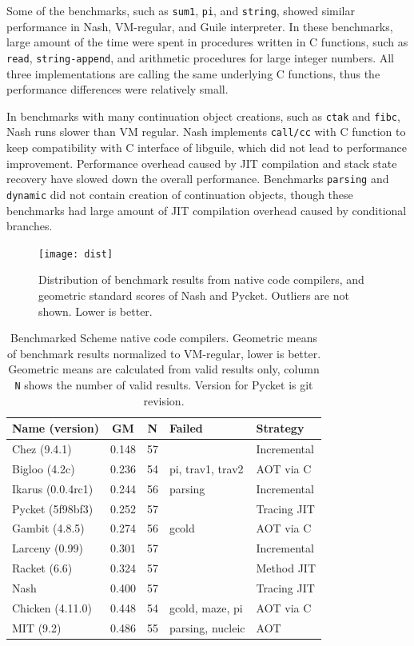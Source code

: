 \documentclass[preprint, 10pt]{sigplanconf}
\begin{document}
Some of the benchmarks, such as \texttt{sum1}, \texttt{pi}, and
\texttt{string}, showed similar performance in Nash, VM-regular, and Guile
interpreter. In these benchmarks, large amount of the time were spent in
procedures written in C functions, such as \texttt{read},
\texttt{string-append}, and arithmetic procedures for large integer numbers.
All three implementations are calling the same underlying C functions, thus
the performance differences were relatively small.

In benchmarks with many continuation object creations, such as \texttt{ctak}
and \texttt{fibc}, Nash runs slower than VM regular. Nash implements
\texttt{call/cc} with C function to keep compatibility with C interface of
libguile, which did not lead to performance improvement.  Performance overhead
caused by JIT compilation and stack state recovery have slowed down the
overall performance.  Benchmarks \texttt{parsing} and \texttt{dynamic} did not
contain creation of continuation objects, though these benchmarks had large
amount of JIT compilation overhead caused by conditional branches.

\begin{figure}
  \centering
  \texttt{[image: dist]}
  \caption{Distribution of benchmark results from native code compilers, and
    geometric standard scores of Nash and Pycket.  Outliers are not
    shown. Lower is better.}
  \label{fig:dist}
\end{figure}

\begin{table}
  \centering
  \begin{tabular}{lccp{11mm}l}
    Name (version) & GM & N & Failed & Strategy \\
    \toprule
    Chez (9.4.1) &  0.148 & 57 & & Incremental \\
    \midrule
    Bigloo (4.2c) & 0.236 & 54 & pi, trav1, trav2 & AOT via C \\
    \midrule
    Ikarus (0.0.4rc1) & 0.244 & 56 & parsing & Incremental \\
    \midrule
    Pycket (5f98bf3) & 0.252 & 57 & & Tracing JIT \\
    \midrule
    Gambit (4.8.5) & 0.274 & 56 & gcold & AOT via C \\
    \midrule
    Larceny (0.99) &  0.301 & 57 & & Incremental \\
    \midrule
    Racket  (6.6) &  0.324 & 57 & & Method JIT \\
    \midrule
    Nash & 0.400 & 57 & & Tracing JIT \\
    \midrule
    Chicken (4.11.0) & 0.448 & 54 & gcold, maze, pi & AOT via C \\
    \midrule
    MIT (9.2) &  0.486 & 55 & parsing, nucleic & AOT \\
  \end{tabular}
  \caption{Benchmarked Scheme native code compilers. Geometric means of
    benchmark results normalized to VM-regular, lower is better. Geometric
    means are calculated from valid results only, column \texttt{N} shows the
    number of valid results. Version for Pycket is git revision.}
\label{tab:nativecomp}
\end{table}
\end{document}
